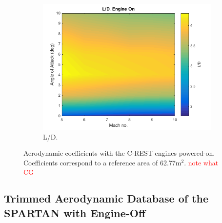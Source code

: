 \begin{figure}[ht]
\begin{subfigure}{.5\textwidth}
				\includegraphics[width=0.99\linewidth]{figures/3_vehicle_design/LD-EngineOn}
				\caption{L/D.}
				\label{fig:LD-EngineOn}
			\end{subfigure}
			\caption{Aerodynamic coefficients with the C-REST engines powered-on. Coefficients correspond to a reference area of 62.77m$^2$. \textcolor{red}{note what CG}}
			\label{fig:EngineOnAero}
		\end{figure}
		
		

\subsection{Trimmed Aerodynamic Database of the SPARTAN with Engine-Off}\label{sec:trimmedongineoff}

